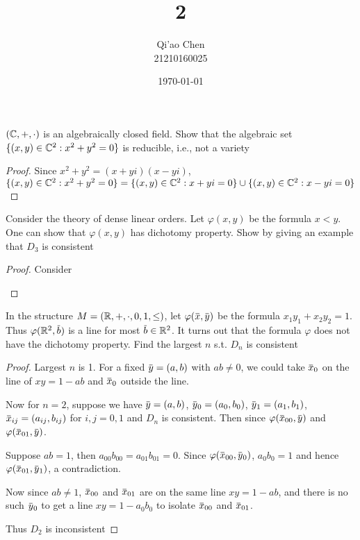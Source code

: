 \documentclass[11pt]{article}
\author{Qi'ao Chen\\21210160025}
\date{\today}
\title{2}
\begin{document}
\maketitle
\begin{exercise}
\((\mathbb{C},+,\cdot)\) is an algebraically closed field. Show that the algebraic set \(\{(x,y)\in\mathbb{C}^2:x^2+y^2=0\}\)
  is reducible, i.e., not a variety
\end{exercise}

\begin{proof}
Since \(x^2+y^2=(x+yi)(x-yi)\), \(\{(x,y)\in\mathbb{C}^2:x^2+y^2=0\}=\{(x,y)\in\mathbb{C}^2:x+yi=0\}\cup\{(x,y)\in\mathbb{C}^2:x-yi=0\}\)
\end{proof}

\begin{exercise}
Consider the theory of dense linear orders. Let \(\varphi(x,y)\) be the formula \(x<y\). One can show
that \(\varphi(x,y)\) has dichotomy property. Show by giving an example that \(D_3\) is consistent
\end{exercise}

\begin{proof}
Consider
\begin{center}\end{center}
\end{proof}

\begin{exercise}
In the structure \(M=(\mathbb{R},+,\cdot,0,1,\le)\), let \(\varphi(\barx,\bary)\) be the formula \(x_1y_1+x_2y_2=1\).
Thus \(\varphi(\R^2,\barb)\) is a line for most \(\barb\in\R^2\). It turns out that the formula \(\varphi\) does not have
the dichotomy property. Find the largest \(n\) s.t. \(D_n\) is consistent
\end{exercise}

\begin{proof}
Largest \(n\) is 1. For a fixed \(\bary=(a,b)\) with \(ab\neq 0\), we could take \(\barx_0\) on the
line of \(xy=1-ab\) and \(\barx_0\) outside the line.

Now for \(n=2\), suppose we
have \(\bary=(a,b)\), \(\bary_0=(a_0,b_0)\), \(\bary_1=(a_1,b_1)\), \(\barx_{ij}=(a_{ij},b_{ij})\)
for \(i,j=0,1\) and \(D_n\) is consistent. Then
since \(\varphi(\barx_{00},\bary)\) and \(\varphi(\barx_{01},\bary)\).

Suppose \(ab=1\), then \(a_{00}b_{00}=a_{01}b_{01}=0\).
Since \(\varphi(\barx_{00},\bary_0)\), \(a_0b_0=1\) and hence \(\varphi(\barx_{01},\bary_1)\), a contradiction.

Now since \(ab\neq 1\), \(\barx_{00}\) and \(\barx_{01}\) are on the same line \(xy=1-ab\), and there
is no such \(\bary_0\) to get a line \(xy=1-a_0b_0\) to isolate \(\barx_{00}\) and \(\barx_{01}\).

Thus \(D_2\) is inconsistent
\end{proof}
\end{document}

